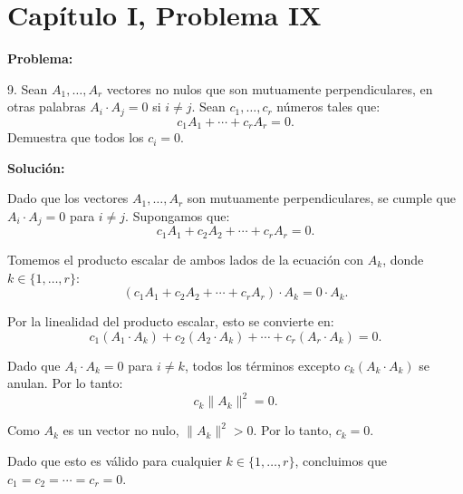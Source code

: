 \section*{Capítulo I, Problema IX}

\textbf{Problema:}

9. Sean $A_1, \dots, A_r$ vectores no nulos que son mutuamente perpendiculares, en otras palabras $A_i \cdot A_j = 0$ si $i \neq j$. Sean $c_1, \dots, c_r$ números tales que:
\[
    c_1 A_1 + \cdots + c_r A_r = 0.
\]
Demuestra que todos los $c_i = 0$.

\textbf{Solución:}

Dado que los vectores $A_1, \dots, A_r$ son mutuamente perpendiculares, se cumple que $A_i \cdot A_j = 0$ para $i \neq j$. Supongamos que:
\[
    c_1 A_1 + c_2 A_2 + \cdots + c_r A_r = 0.
\]

Tomemos el producto escalar de ambos lados de la ecuación con $A_k$, donde $k \in \{1, \dots, r\}$:
\[
    \left(c_1 A_1 + c_2 A_2 + \cdots + c_r A_r\right) \cdot A_k = 0 \cdot A_k.
\]

Por la linealidad del producto escalar, esto se convierte en:
\[
    c_1 (A_1 \cdot A_k) + c_2 (A_2 \cdot A_k) + \cdots + c_r (A_r \cdot A_k) = 0.
\]

Dado que $A_i \cdot A_k = 0$ para $i \neq k$, todos los términos excepto $c_k (A_k \cdot A_k)$ se anulan. Por lo tanto:
\[
    c_k \|A_k\|^2 = 0.
\]

Como $A_k$ es un vector no nulo, $\|A_k\|^2 > 0$. Por lo tanto, $c_k = 0$.

Dado que esto es válido para cualquier $k \in \{1, \dots, r\}$, concluimos que $c_1 = c_2 = \cdots = c_r = 0$. 
